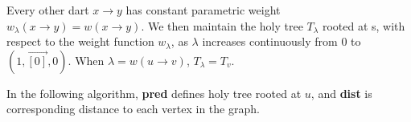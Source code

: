 \documentclass{article}
\begin{document}
Every other dart $x \rightarrow y$ has constant parametric weight 
$w_{\lambda}(x \rightarrow y) = w(x \rightarrow y)$.
We then maintain the holy tree $T_{\lambda}$ rooted at s, with respect
to the weight function $w_{\lambda}$, as $\lambda$ increases continuously from
0 to $( 1, \vec{[0]}, 0 )$. When $\lambda = w(u \rightarrow v)$, 
$T_{\lambda} = T_v$.

In the following algorithm, \textbf{pred} defines holy tree rooted at $u$, and 
\textbf{dist} is corresponding distance to each vertex in the graph. \\

\end{document}
